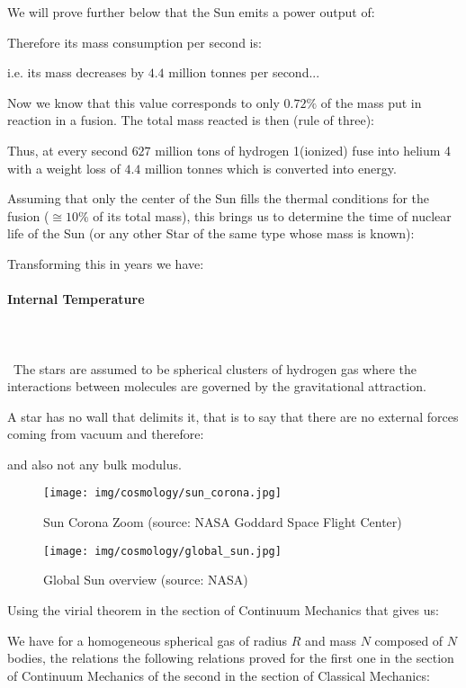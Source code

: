 	We will prove further below that the Sun emits a power output of:
	
	Therefore its mass consumption per second is:
	
	i.e. its mass decreases by $4.4$ million tonnes per second...
	
	Now we know that this value corresponds to only $0.72\%$ of the mass put in reaction in a fusion. The total mass reacted  is then (rule of three):
	
	Thus, at every second $627$ million tons of hydrogen 1(ionized) fuse into helium 4 with a weight loss of $4.4$ million tonnes which is converted into energy.
	
	Assuming that only the center of the Sun fills the thermal conditions for the fusion ($\cong 10\%$ of its total mass), this brings us to determine the time of nuclear life of the Sun (or any other Star of the same type whose mass is known):
	
	Transforming this in years we have:
	
	
	\paragraph{Internal Temperature}\mbox{}\\\\\
	The stars are assumed to be spherical clusters of hydrogen gas where the interactions between molecules are governed by the gravitational attraction.

	A star has no wall that delimits it, that is to say that there are no external forces coming from vacuum and therefore:
	
	and also not any bulk modulus.
	\begin{figure}[H]
		\centering
		\texttt{[image: img/cosmology/sun\_corona.jpg]}	
		\caption[Sun Corona Zoom]{Sun Corona Zoom (source: NASA Goddard Space Flight Center)}
	\end{figure}
	\begin{figure}[H]
		\centering
		\texttt{[image: img/cosmology/global\_sun.jpg]}	
		\caption[Global Sun overview]{Global Sun overview (source: NASA)}
	\end{figure}
		
	Using the virial theorem in the section of Continuum Mechanics that gives us:
	
	We have for a homogeneous spherical gas of radius $R$ and mass $N$ composed of $N$ bodies, the relations the following relations proved for the first one in the section of Continuum Mechanics of the second in the section of Classical Mechanics:
	
